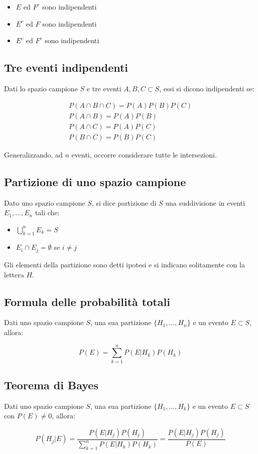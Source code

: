 \documentclass{subfiles}
\begin{document}
\begin{itemize}
    \item $E$ ed $F^c$ sono indipendenti
    \item $E^c$ ed $F$ sono indipendenti
    \item $E^c$ ed $F^c$ sono indipendenti
\end{itemize}

\subsection{Tre eventi indipendenti}

Dati lo spazio campione $S$ e tre eventi $A,B,C \subset S$, essi si dicono indipendenti se:

$$
\begin{matrix}
P(A \cap B \cap C) = P(A)P(B)P(C) \\
P(A \cap B) = P(A)P(B) \\
P(A \cap C) = P(A)P(C) \\
P(B \cap C) = P(B)P(C)
\end{matrix}
$$

\noindent
Generalizzando, ad $n$ eventi, occorre considerare tutte le intersezioni.

\subsection{Partizione di uno spazio campione}

Dato uno spazio campione $S$, si dice partizione di $S$ una suddivisione in eventi $E_1, \dots, E_n$ tali che:

\begin{itemize}
    \item $\bigcup^n_{k=1} E_k = S$
    \item $E_i \cap E_j = \emptyset$ se $i \neq j$
\end{itemize}

Gli elementi della partizione sono detti ipotesi e si indicano solitamente con la lettera $H$.

\subsection{Formula delle probabilità totali}

Dati uno spazio campione $S$, una sua partizione $\{H_1, \dots, H_n\}$ e un evento $E \subset S$, allora:

$$
P(E) = \sum^n_{k=1} P(E|H_k)P(H_k)
$$

\subsection{Teorema di Bayes}

Dati uno spazio campione $S$, una sua partizione $\{H_1, \dots, H_k\}$ e un evento $E \subset S$ con $P(E) \neq 0$, allora:

$$
P(H_j|E) = \frac{P(E|H_j)P(H_j)}{\sum^n_{k=1} P(E|H_k)P(H_k)} = \frac{P(E|H_j)P(H_j)}{P(E)}
$$
\end{document}
